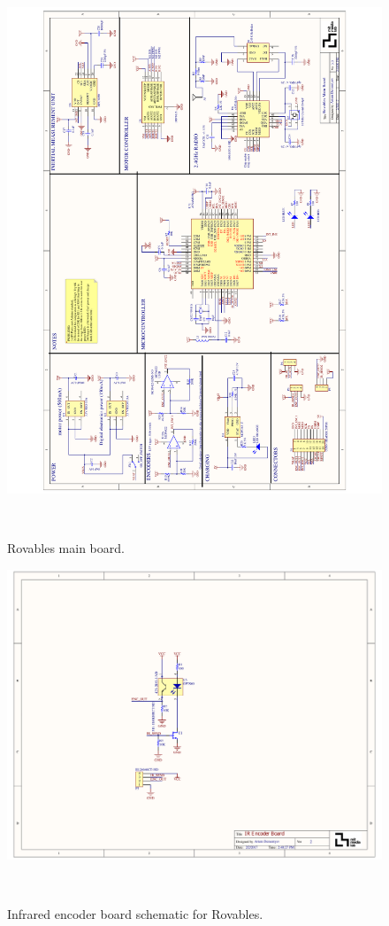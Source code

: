 \begin{figure}[t]
\centering
  \centerline{\includegraphics[width=0.8\paperwidth]{pictures/appendix/motor_driver_V3.pdf}}
  \caption{Rovables main board. }~\label{fig:speaker}
\end{figure}

\begin{figure}[t]
\centering
  \centerline{\includegraphics[angle=90,origin=c, width=0.6\paperwidth]{pictures/appendix/schematic_ir_encoder.pdf}}
  \caption{Infrared encoder board schematic for Rovables.}~\label{fig:IR_board_schematic}
\end{figure}

